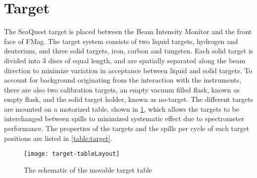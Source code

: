 \documentclass[../main.tex]{subfiles}
\begin{document}
\section{Target}
The SeaQuest target is placed between the Beam Intensity Monitor and the front face
of FMag. The target system consists of two liquid targets, hydrogen and deuterium,
and three solid targets, iron, carbon and tungsten. Each solid target is divided
into \num{3} discs of equal length, and are spatially separated along the beam
direction to minimize variation in acceptance between liquid and solid targets.
To account for background originating from the interaction with the instruments,
there are also two calibration targets, an empty vacuum filled flask, known as
empty flask, and the solid target holder, known as no-target. The different targets
are mounted on a motorized table, shown in \cref{fig:target}, which allows the
targets to be interchanged between spills to minimized systematic effect due to
spectrometer performance. The properties of the targets and the spills per cycle
of each target positions are listed in \cref{table:target}.
\begin{figure}[htbp!]
	\centering
	\texttt{[image: target-tableLayout]}
	\caption{The schematic of the movable target table}
	\label{fig:target}
\end{figure}
\end{document}
